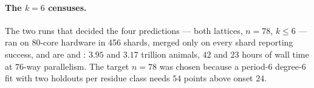 \documentclass[11pt]{article}
\begin{document}
\paragraph{The $k = 6$ censuses.} The two runs that decided the four
predictions --- both lattices, $n = 78$, $k \le 6$ --- ran on 80-core hardware
in 456 shards, merged only on every shard reporting success, and are
 and
: $3.95$ and $3.17$ trillion
animals, $42$ and $23$ hours of wall time at $76$-way parallelism. The target
$n = 78$ was chosen because a period-$6$ degree-$6$ fit with two holdouts per
residue class needs $54$ points above onset $24$.



\end{document}
